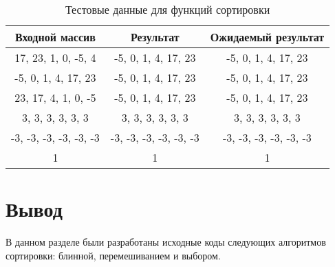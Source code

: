 \begin{table}[H]
	\begin{center}
		\captionsetup{justification=raggedright,singlelinecheck=off}
		\caption{\label{tests}Тестовые данные для функций сортировки}
		\begin{tabular}{|c|c|c|}
			\hline
			\textbf{Входной массив} & \textbf{Результат} & \textbf{Ожидаемый результат} \\
			\hline
			17, 23, 1, 0, -5, 4 & -5, 0, 1, 4, 17, 23  & -5, 0, 1, 4, 17, 23 \\
			\hline
			-5, 0, 1, 4, 17, 23 & -5, 0, 1, 4, 17, 23  & -5, 0, 1, 4, 17, 23 \\
			\hline
			23, 17, 4, 1, 0, -5 & -5, 0, 1, 4, 17, 23  & -5, 0, 1, 4, 17, 23 \\
			\hline
			3, 3, 3, 3, 3, 3 & 3, 3, 3, 3, 3, 3 & 3, 3, 3, 3, 3, 3 \\
			\hline
			-3, -3, -3, -3, -3, -3 & -3, -3, -3, -3, -3, -3 & -3, -3, -3, -3, -3, -3 \\
			\hline
			1 & 1 & 1 \\
			\hline
		\end{tabular}
	\end{center}
\end{table}

\section*{Вывод}

В данном разделе были разработаны исходные коды следующих алгоритмов сортировки: блинной, перемешиванием и выбором.

\clearpage
